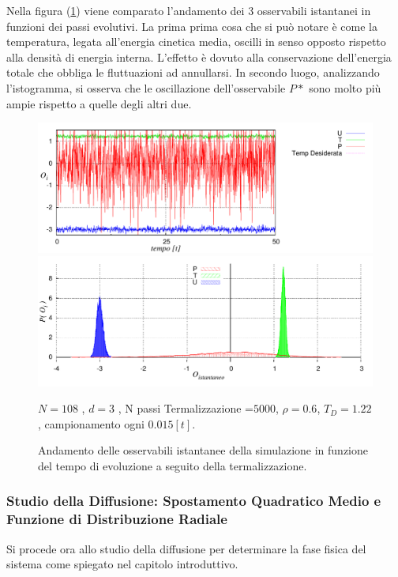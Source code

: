 Nella figura (\ref{fig: Problema10}) viene comparato l'andamento dei 3 osservabili istantanei in funzioni dei passi evolutivi. La prima prima cosa che si può notare è come la temperatura, legata all'energia cinetica media, oscilli in senso opposto rispetto alla densità di energia interna. L'effetto è dovuto alla conservazione dell'energia totale che obbliga le fluttuazioni ad annullarsi.
In secondo luogo, analizzando l'istogramma, si osserva che le oscillazione dell'osservabile $P*$ sono molto più ampie rispetto a quelle degli altri due.
	
	\begin{figure}[htbp]
		\centering
		\caption[Sfere Soffici$/$Problema10.cpp]{Andamento delle osservabili istantanee della simulazione in funzione del tempo di evoluzione a seguito della termalizzazione.}\label{fig: Problema10}\vspace{-15pt}
		\includegraphics[scale=0.85]{Immagini/Soffici/OvsStep}

		\includegraphics[scale=0.85]{Immagini/Soffici/IstoO}


		\centering  \footnotesize{$N= 108$ , $d=3$ , N passi Termalizzazione =$ 5000$, $\rho = 0.6$,	$T_D=1.22$, campionamento ogni $0.015 [t]$.}
	\end{figure}



\FloatBarrier 
\subsubsection{Studio della Diffusione: Spostamento Quadratico Medio e Funzione di Distribuzione Radiale}
Si procede ora allo studio della diffusione per determinare la fase fisica del sistema come spiegato nel capitolo introduttivo.

